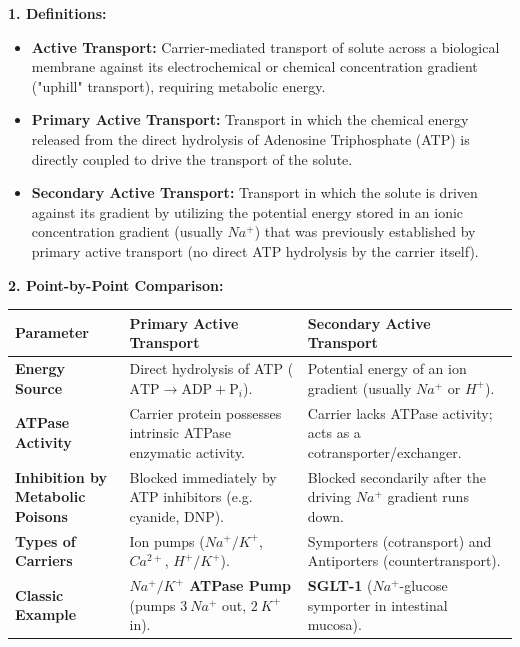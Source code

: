 \documentclass[11pt,a4paper]{article}
\begin{document}
\begin{ansbox}
\textbf{1. Definitions:}
\begin{itemize}[leftmargin=*]
    \item \textbf{Active Transport:} Carrier-mediated transport of solute across a biological membrane against its electrochemical or chemical concentration gradient ("uphill" transport), requiring metabolic energy.
    \item \textbf{Primary Active Transport:} Transport in which the chemical energy released from the direct hydrolysis of Adenosine Triphosphate (ATP) is directly coupled to drive the transport of the solute.
    \item \textbf{Secondary Active Transport:} Transport in which the solute is driven against its gradient by utilizing the potential energy stored in an ionic concentration gradient (usually $Na^+$) that was previously established by primary active transport (no direct ATP hydrolysis by the carrier itself).
\end{itemize}

\textbf{2. Point-by-Point Comparison:}
\begin{center}
\begin{tabularx}{\textwidth}{p{3.5cm}X X}
\toprule
\textbf{Parameter} & \textbf{Primary Active Transport} & \textbf{Secondary Active Transport} \\
\midrule
\textbf{Energy Source} & Direct hydrolysis of ATP ($\text{ATP} \rightarrow \text{ADP} + \text{P}_i$). & Potential energy of an ion gradient (usually $Na^+$ or $H^+$). \\
\textbf{ATPase Activity} & Carrier protein possesses intrinsic ATPase enzymatic activity. & Carrier lacks ATPase activity; acts as a cotransporter/exchanger. \\
\textbf{Inhibition by Metabolic Poisons} & Blocked immediately by ATP inhibitors (e.g. cyanide, DNP). & Blocked secondarily after the driving $Na^+$ gradient runs down. \\
\textbf{Types of Carriers} & Ion pumps ($Na^+/K^+$, $Ca^{2+}$, $H^+/K^+$). & Symporters (cotransport) and Antiporters (countertransport). \\
\textbf{Classic Example} & \textbf{$Na^+/K^+$ ATPase Pump} (pumps $3\ Na^+$ out, $2\ K^+$ in). & \textbf{SGLT-1} ($Na^+$-glucose symporter in intestinal mucosa). \\
\bottomrule
\end{tabularx}
\end{center}


\end{ansbox}
\end{document}
